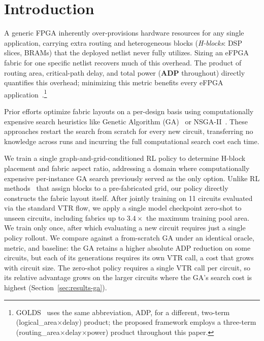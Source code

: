 \documentclass[sigconf]{acmart}
\begin{document}
\section{Introduction}
\label{sec:intro}

A generic FPGA inherently over-provisions hardware resources for any single
application, carrying extra routing and heterogeneous blocks
(\emph{H-blocks}: DSP slices, BRAMs) that the deployed netlist never fully
utilizes. Sizing an eFPGA fabric for one specific netlist recovers much of
this overhead. The product of routing area, critical-path delay, and total
power (\textbf{ADP} throughout) directly quantifies this overhead; minimizing
this metric benefits every eFPGA application~\cite{golds,nsgaii}.\footnote{GOLDS~\cite{golds}
uses the same abbreviation, ADP, for a different, two-term
(logical\_area$\times$delay) product; the proposed framework employs a
three-term (routing\_area$\times$delay$\times$power) product throughout this
paper.}

Prior efforts optimize fabric layouts on a per-design basis using
computationally expensive search heuristics like Genetic Algorithm (GA)~\cite{golds}
or NSGA-II~\cite{nsgaii}. These approaches restart the search from scratch
for every new circuit, transferring no knowledge across runs and incurring
the full computational search cost each time.

We train a single graph-and-grid-conditioned RL policy to
determine H-block placement and fabric aspect ratio, addressing a domain
where computationally expensive per-instance GA search previously served as
the only option. Unlike RL methods~\cite{rlplace,vprgym} that assign blocks to a pre-fabricated
grid, our policy directly constructs the fabric layout itself. After
jointly training on 11 circuits evaluated via the standard VTR flow, we
apply a single model checkpoint zero-shot to unseen circuits, including
fabrics up to $3.4\times$ the maximum training pool area. We train only
once, after which evaluating a new circuit requires just a single policy
rollout.
We compare against a from-scratch GA under an identical oracle, metric, and
baseline: the GA retains a higher absolute ADP reduction on some circuits,
but each of its generations requires its own VTR call, a cost that grows
with circuit size. The zero-shot policy requires a single VTR call per
circuit, so its relative advantage grows on the larger circuits where the
GA's search cost is highest (Section~\ref{sec:results-ga}).
\end{document}

